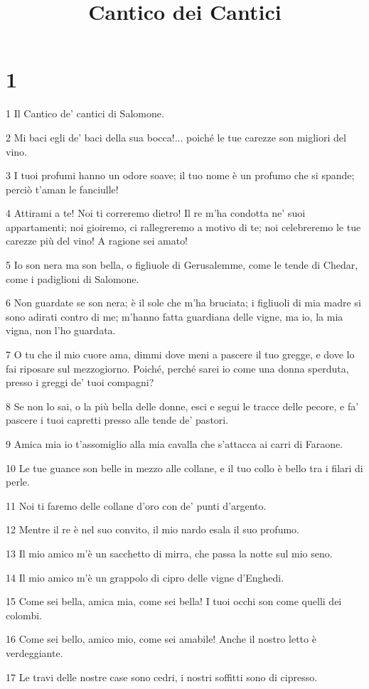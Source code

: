 

\title{Cantico dei Cantici}


\chapter{1}

\par 1 Il Cantico de' cantici di Salomone.
\par 2 Mi baci egli de' baci della sua bocca!... poiché le tue carezze son migliori del vino.
\par 3 I tuoi profumi hanno un odore soave; il tuo nome è un profumo che si spande; perciò t'aman le fanciulle!
\par 4 Attirami a te! Noi ti correremo dietro! Il re m'ha condotta ne' suoi appartamenti; noi gioiremo, ci rallegreremo a motivo di te; noi celebreremo le tue carezze più del vino! A ragione sei amato!
\par 5 Io son nera ma son bella, o figliuole di Gerusalemme, come le tende di Chedar, come i padiglioni di Salomone.
\par 6 Non guardate se son nera; è il sole che m'ha bruciata; i figliuoli di mia madre si sono adirati contro di me; m'hanno fatta guardiana delle vigne, ma io, la mia vigna, non l'ho guardata.
\par 7 O tu che il mio cuore ama, dimmi dove meni a pascere il tuo gregge, e dove lo fai riposare sul mezzogiorno. Poiché, perché sarei io come una donna sperduta, presso i greggi de' tuoi compagni?
\par 8 Se non lo sai, o la più bella delle donne, esci e segui le tracce delle pecore, e fa' pascere i tuoi capretti presso alle tende de' pastori.
\par 9 Amica mia io t'assomiglio alla mia cavalla che s'attacca ai carri di Faraone.
\par 10 Le tue guance son belle in mezzo alle collane, e il tuo collo è bello tra i filari di perle.
\par 11 Noi ti faremo delle collane d'oro con de' punti d'argento.
\par 12 Mentre il re è nel suo convito, il mio nardo esala il suo profumo.
\par 13 Il mio amico m'è un sacchetto di mirra, che passa la notte sul mio seno.
\par 14 Il mio amico m'è un grappolo di cipro delle vigne d'Enghedi.
\par 15 Come sei bella, amica mia, come sei bella! I tuoi occhi son come quelli dei colombi.
\par 16 Come sei bello, amico mio, come sei amabile! Anche il nostro letto è verdeggiante.
\par 17 Le travi delle nostre case sono cedri, i nostri soffitti sono di cipresso.

